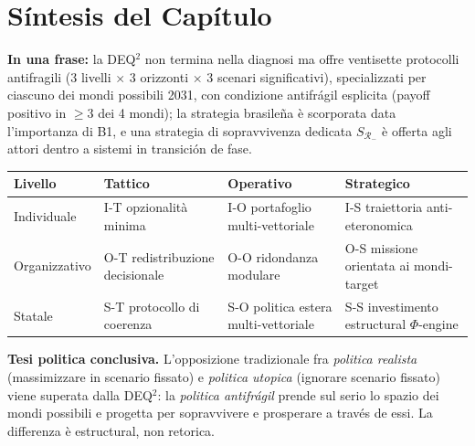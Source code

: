 \section{Síntesis del Capítulo}\label{sintesi-del-capítulo}

\Proved{} \textbf{In una frase:} la DEQ$^2$ non termina nella diagnosi ma
offre ventisette protocolli antifragili (3 livelli $\times$ 3 orizzonti $\times$ 3
scenari significativi), specializzati per ciascuno dei mondi possibili
2031, con condizione antifrágil esplicita (payoff positivo in
\(\geq 3\) dei 4 mondi); la strategia brasileña è scorporata data
l'importanza di B1, e una strategia di sopravvivenza dedicata
\(S_{\mathcal{R}_-}\) è offerta agli attori dentro a sistemi in
transición de fase.

{\def\LTcaptype{none} %
{\small\begin{longtable}[]{@{}
  >{\raggedright\arraybackslash}p{}
  >{\raggedright\arraybackslash}p{}
  >{\raggedright\arraybackslash}p{}
  >{\raggedright\arraybackslash}p{}@{}}
\toprule\noalign{}
\begin{minipage}[b]{\linewidth}\raggedright
Livello
\end{minipage} & \begin{minipage}[b]{\linewidth}\raggedright
Tattico
\end{minipage} & \begin{minipage}[b]{\linewidth}\raggedright
Operativo
\end{minipage} & \begin{minipage}[b]{\linewidth}\raggedright
Strategico
\end{minipage} \\
\midrule\noalign{}
\endhead
\bottomrule\noalign{}
\endlastfoot
Individuale & I-T opzionalità minima & I-O portafoglio multi-vettoriale
& I-S traiettoria anti-eteronomica \\
Organizzativo & O-T redistribuzione decisionale & O-O ridondanza
modulare & O-S missione orientata ai mondi-target \\
Statale & S-T protocollo di coerenza & S-O politica estera
multi-vettoriale & S-S investimento estructural \(\Phi\)-engine \\
\end{longtable}}
}

\Hypoth{} \textbf{Tesi politica conclusiva.} L'opposizione tradizionale
fra \emph{politica realista} (massimizzare in scenario fissato) e
\emph{politica utopica} (ignorare scenario fissato) viene superata dalla
DEQ$^2$: la \emph{politica antifrágil} prende sul serio lo spazio dei
mondi possibili e progetta per sopravvivere e prosperare a través de
essi. La differenza è estructural, non retorica.



